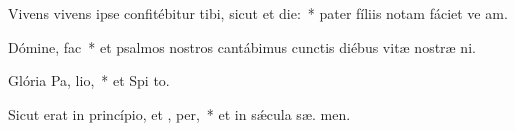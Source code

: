 \item Vivens vivens ipse confitébitur tibi, sicut et  die:~* pater fíliis notam fáciet ve am.
\item Dómine,   fac~* et psalmos nostros cantábimus cunctis diébus vitæ nostræ   ni.
\item Glória Pa,  lio,~* et Spi to.
\item Sicut erat in princípio, et ,  per,~* et in sǽcula sæ. men.
